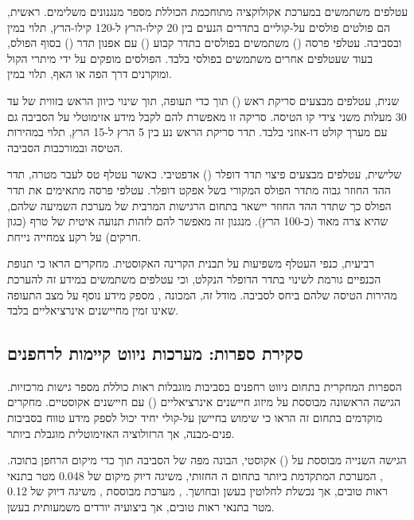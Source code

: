 עטלפים משתמשים במערכת אקולוקציה מתוחכמת הכוללת מספר מנגנונים משלימים. ראשית, הם פולטים פולסים על-קוליים בתדרים הנעים בין 20 קילו-הרץ ל-120 קילו-הרץ, תלוי במין ובסביבה. עטלפי פרסה () משתמשים בפולסים בתדר קבוע () עם אפנון תדר () בסוף הפולס, בעוד שעטלפים אחרים משתמשים בפולסי  בלבד. הפולסים מופקים על ידי מיתרי הקול ומוקרנים דרך הפה או האף, תלוי במין. \cite{Schnitzler1968DSC}

שנית, עטלפים מבצעים סריקת ראש () תוך כדי תעופה, תוך שינוי כיוון הראש בזווית של עד 30 מעלות משני צידי קו הטיסה. סריקה זו מאפשרת להם לקבל מידע אזימוטלי על הסביבה גם עם מערך קולט דו-אוזני בלבד. תדר סריקת הראש נע בין 5 הרץ ל-15 הרץ, תלוי במהירות הטיסה ובמורכבות הסביבה. \cite{MossEcholocation}

שלישית, עטלפים מבצעים פיצוי תדר דופלר () אדפטיבי. כאשר עטלף טס לעבר מטרה, תדר ההד החוזר גבוה מתדר הפולס המקורי בשל אפקט דופלר. עטלפי פרסה מתאימים את תדר הפולס כך שתדר ההד החוזר יישאר בתחום הרגישות המרבית של מערכת השמיעה שלהם, שהיא צרה מאוד (כ-100 הרץ). מנגנון זה מאפשר להם לזהות תנועה איטית של טרף (כגון חרקים) על רקע צמחייה נייחת. \cite{Schuller1974DSC}

רביעית, כנפי העטלף משפיעות על תבנית הקרינה האקוסטית. מחקרים הראו כי תנופת הכנפיים גורמת לשינוי בתדר הדופלר הנקלט, וכי עטלפים משתמשים במידע זה להערכת מהירות הטיסה שלהם ביחס לסביבה. מודל זה, המכונה , מספק מידע נוסף על מצב התעופה שאינו זמין מחיישנים אינרציאליים בלבד. \cite{GriffithBatEcholocation}

\subsection{סקירת ספרות: מערכות ניווט קיימות לרחפנים}
\label{sec:ch01_literature}

הספרות המחקרית בתחום ניווט רחפנים בסביבות מוגבלות ראות כוללת מספר גישות מרכזיות. הגישה הראשונה מבוססת על מיזוג חיישנים אינרציאליים () עם חיישנים אקוסטיים. מחקרים מוקדמים בתחום זה הראו כי שימוש בחיישן על-קולי יחיד יכול לספק מידע טווח בסביבות פנים-מבנה, אך הרזולוציה האזימוטלית מוגבלת ביותר. \cite{Thrun2005ProbRobotics}

הגישה השנייה מבוססת על  () אקוסטי, הבונה מפה של הסביבה תוך כדי מיקום הרחפן בתוכה. , המערכת המתקדמת ביותר בתחום ה החזותי, משיגה דיוק מיקום של 0.048 מטר בתנאי ראות טובים, אך נכשלת לחלוטין בעשן ובחושך. , מערכת  מבוססת , משיגה דיוק של 0.12 מטר בתנאי ראות טובים, אך ביצועיה יורדים משמעותית בעשן. \cite{MurArtal2015ORB} \cite{Zhang2014LOAM}

